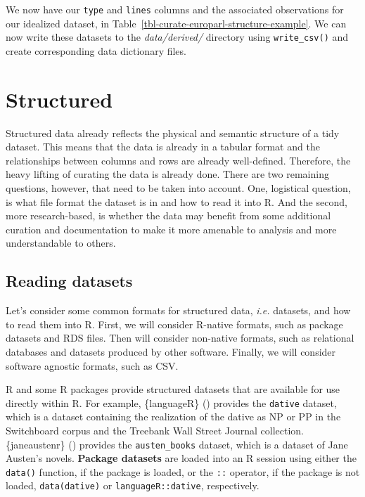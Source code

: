 \documentclass[
  letterpaper,
  krantz1]{latex/krantz-mod}
\theoremstyle{definition}
\theoremstyle{definition}
\theoremstyle{remark}
\begin{document}
We now have our \texttt{type} and \texttt{lines} columns and the
associated observations for our idealized dataset, in
Table~\ref{tbl-curate-europarl-structure-example}. We can now write
these datasets to the \emph{data/derived/} directory using
\texttt{write\_csv()} and create corresponding data dictionary files.

\section{Structured}\label{structured}

Structured data already reflects the physical and semantic structure of
a tidy dataset. This means
that the data is already in a tabular format and the relationships
between columns and rows are already well-defined. Therefore, the heavy
lifting of curating the data is already done. There are two remaining
questions, however, that need to be taken into account. One, logistical
question, is what file format the dataset is in and how to read it into
R. And the second, more research-based, is whether the data may benefit
from some additional curation and documentation to make it more amenable
to analysis and more understandable to others.

\subsection{Reading datasets}\label{reading-datasets}

Let's consider some common formats for structured data, \emph{i.e.}
datasets, and how to read them into R. First, we will
consider R-native formats, such as package
datasets and RDS
files. Then will consider non-native
formats, such as relational databases and
datasets produced by other software. Finally, we will consider software
agnostic formats, such as CSV.

R and some R packages provide structured datasets that are available for
use directly within R. For example,
\{languageR\} () provides the \texttt{dative} dataset,
which is a dataset containing the realization of the dative as NP or PP
in the Switchboard corpus and the Treebank Wall Street Journal
collection. \{janeaustenr\} () provides the \texttt{austen\_books}
dataset, which is a dataset of Jane Austen's novels. \textbf{Package
datasets} are loaded into an R session using
either the \texttt{data()} function, if the package is loaded, or the
\texttt{::} operator\index{::}, if the package is not loaded,
\texttt{data(dative)} or \texttt{languageR::dative}, respectively.
\end{document}
